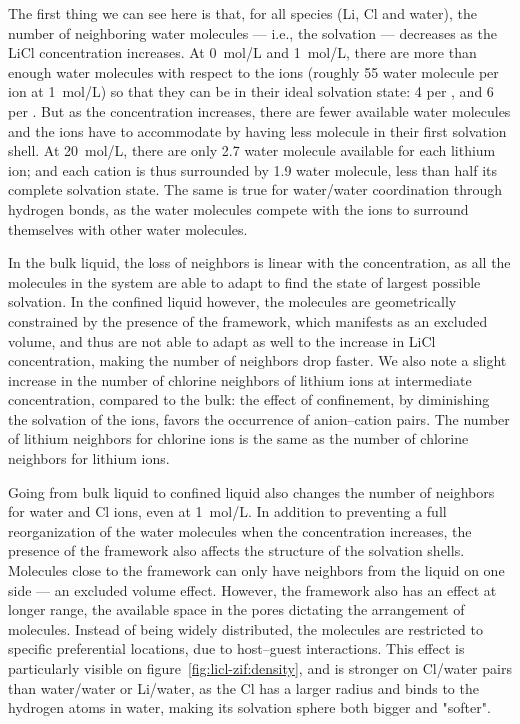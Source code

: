 \documentclass[thesis]{subfiles}
\begin{document}
The first thing we can see here is that, for all species (Li, Cl and water), the
number of neighboring water molecules --- i.e., the solvation --- decreases as
the LiCl concentration increases. At \SI{0}{mol/L} and \SI{1}{mol/L}, there are
more than enough water molecules with respect to the ions (roughly 55 water
molecule per ion at \SI{1}{mol/L}) so that they can be in their ideal solvation
state: 4  per , and 6  per . But as the
concentration increases, there are fewer available water molecules and the ions
have to accommodate by having less molecule in their first solvation shell. At
\SI{20}{mol/L}, there are only 2.7 water molecule available for each lithium
ion; and each cation is thus surrounded by 1.9 water molecule, less than half
its complete solvation state. The same is true for water/water coordination
through hydrogen bonds, as the water molecules compete with the ions to surround
themselves with other water molecules.

In the bulk liquid, the loss of neighbors is linear with the concentration, as
all the molecules in the system are able to adapt to find the state of largest
possible solvation. In the confined liquid however, the molecules are
geometrically constrained by the presence of the  framework, which
manifests as an excluded volume, and thus are not able to adapt as well to the
increase in LiCl concentration, making the number of neighbors drop faster. We
also note a slight increase in the number of chlorine neighbors of lithium ions
at intermediate concentration, compared to the bulk: the effect of confinement,
by diminishing the solvation of the ions, favors the occurrence of anion--cation
pairs. The number of lithium neighbors for chlorine ions is the same as the
number of chlorine neighbors for lithium ions.

Going from bulk liquid to confined liquid also changes the number of neighbors
for water and Cl ions, even at \SI{1}{mol/L}. In addition to preventing a full
reorganization of the water molecules when the concentration increases, the
presence of the framework also affects the structure of the solvation shells.
Molecules close to the framework can only have neighbors from the liquid on one
side --- an excluded volume effect. However, the framework also has an effect at
longer range, the available space in the pores dictating the arrangement of
molecules. Instead of being widely distributed, the molecules are restricted to
specific preferential locations, due to host--guest interactions. This effect is
particularly visible on figure~\ref{fig:licl-zif:density}, and is stronger on Cl/water
pairs than water/water or Li/water, as the Cl has a larger radius and binds to
the hydrogen atoms in water, making its solvation sphere both bigger and
"softer".
\end{document}
